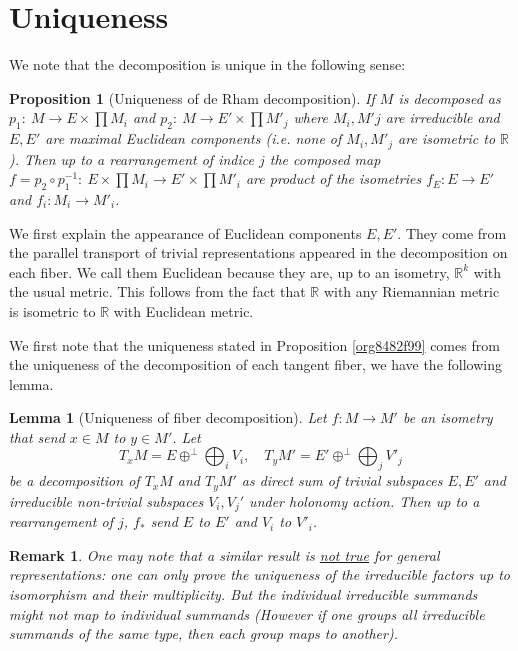 \documentclass[11pt]{article}
\newtheorem{remark}{Remark}
\newtheorem{lemma}[theorem]{Lemma}
\newtheorem{proposition}{Proposition}[theorem]
\begin{document}
\section{Uniqueness}
\label{sec:orgcaabcb9}
We note that the decomposition is unique in the following sense: 

\begin{proposition}[Uniqueness of de Rham decomposition]
\label{prop:uniqueness}
\label{org8482f99} If \(M\) is decomposed as \(p_1:\ M\longrightarrow E\times \prod M_i\) and \(p_2:\
M\longrightarrow E'\times\prod M'_j\) where \(M_i, M'j\) are irreducible and \(E,E'\) are maximal
Euclidean components (i.e. none of \(M_i, M'_j\) are isometric to \(\mathbb{R}\)). Then up to a
rearrangement of indice \(j\) the composed map \(f=p_2\circ p_1^{-1}:\ E\times\prod M_i \longrightarrow
E'\times \prod M'_i\) are product of the isometries \(f_E: E\longrightarrow E'\) and \(f_i:M_i
\longrightarrow M'_i\).
\end{proposition}

We first explain the appearance of Euclidean components \(E,E'\). They come from the parallel
transport of trivial representations appeared in the decomposition on each fiber. We call them
Euclidean because they are, up to an isometry, \(\mathbb{R}^k\) with the usual metric. This follows
from the fact that \(\mathbb{R}\) with any Riemannian metric is isometric to \(\mathbb{R}\) with
Euclidean metric.

We first note that the uniqueness stated in Proposition \ref{org8482f99} comes from the uniqueness of
the decomposition of each tangent fiber, we have the following lemma.

\begin{lemma}[Uniqueness of fiber decomposition]
\label{lem:uniqueness-fiber}
\label{org9e7ee43}
Let \(f: M\longrightarrow M'\) be an isometry that send \(x\in M\) to \(y\in M'\). Let 
\[
T_x M = E \oplus^\perp \bigoplus_i V_i,\quad T_yM' = E' \oplus^\perp \bigoplus_j V'_j
\]
be a decomposition of \(T_xM\) and \(T_yM'\) as direct sum of trivial subspaces \(E,E'\) and irreducible non-trivial
subspaces \(V_i, V_j'\) under holonomy action. Then up to a rearrangement of \(j\), \(f_*\) send \(E\) to
\(E'\) and \(V_i\) to \(V'_i\). 
\end{lemma}

\begin{remark}
One may note that a similar result is \uline{not true} for general representations: one can only prove the
uniqueness of the irreducible factors up to isomorphism and their multiplicity. But the individual irreducible
summands might not map to individual summands (However if one groups all irreducible summands of
the same type, then each group maps to another).
\end{remark}
\end{document}
